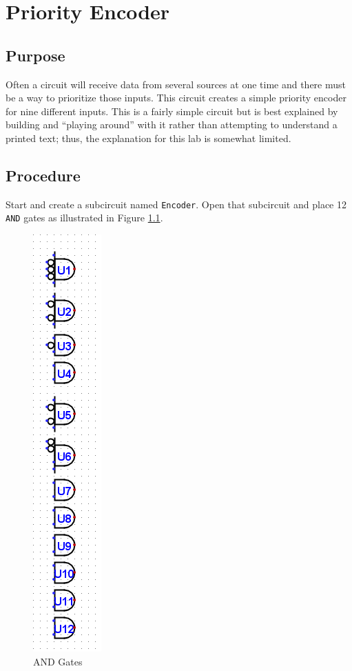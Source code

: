\chapter{Priority Encoder}

\section{Purpose}

Often a circuit will receive data from several sources at one time and there must be a way to prioritize those inputs. This circuit creates a simple priority encoder for nine different inputs. This is a fairly simple circuit but is best explained by building and ``playing around'' with it rather than attempting to understand a printed text; thus, the explanation for this lab is somewhat limited.

\section{Procedure}

Start \LE and create a subcircuit named \lstinline[columns=fixed]|Encoder|. Open that subcircuit and place 12 \texttt{AND} gates as illustrated in Figure \ref{fig:03-01}.

\begin{figure}[H]
	\centering
	\includegraphics[width=\maxwidth{.95\linewidth}]{gfx/03-01}
	\caption{AND Gates}
	\label{fig:03-01}
\end{figure}

